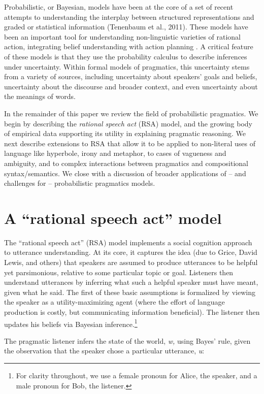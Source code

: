 \documentclass[]{elsarticle}
\begin{document}
Probabilistic, or Bayesian, models have been at the core of a set of
recent attempts to understanding the interplay between structured
representations and graded or statistical information (Tenenbaum et al.,
2011). These models have been an important tool for understanding
non-linguistic varieties of rational action, integrating belief
understanding with action planning \citep{baker2009}. A
critical feature of these models is that they use the probability
calculus to describe inferences under uncertainty. Within formal models
of pragmatics, this uncertainty stems from a variety of sources,
including uncertainty about speakers' goals and beliefs, uncertainty
about the discourse and broader context, and even uncertainty about the
meanings of words.

In the remainder of this paper we review the field of probabilistic
pragmatics. We begin by describing the \emph{rational speech act}
(RSA) model, and the growing body of empirical data supporting its
utility in explaining pragmatic reasoning. We next describe extensions
to RSA that allow it to be applied to non-literal uses of language like
hyperbole, irony and metaphor, to cases of vagueness and ambiguity, and
to complex interactions between pragmatics and compositional
syntax/semantics. We close with a discussion of broader applications of
-- and challenges for -- probabilistic pragmatics models.

\section{A ``rational speech act'' model}\label{a-rational-speech-act-model}

The ``rational speech act'' (RSA) model implements a social
cognition approach to utterance understanding. At its core, it captures
the idea (due to Grice, David Lewis, and others) that speakers are assumed to
produce utterances to be helpful yet parsimonious, relative to some
particular topic or goal. Listeners then understand utterances by
inferring what such a helpful speaker must have meant, given what he
said. The first of these basic assumptions is formalized by viewing the speaker
as a utility-maximizing agent (where the effort of language production
is costly, but communicating information beneficial). The listener then
updates his beliefs via Bayesian inference.\footnote{For clarity throughout, we use a female pronoun for Alice, the speaker, and a male pronoun for Bob, the listener.}

The pragmatic listener infers the state of the world, \emph{w,} using
Bayes' rule, given the observation that the speaker chose a particular
utterance, \emph{u}:
\end{document}
